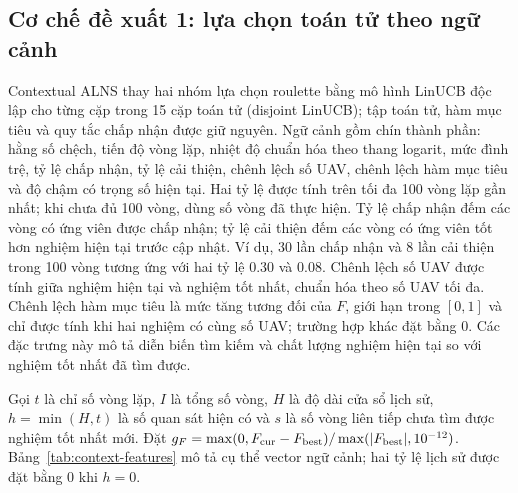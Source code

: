 \documentclass[11pt,a4paper]{article}
\begin{document}
\subsection{Cơ chế đề xuất 1: lựa chọn toán tử theo ngữ cảnh}
Contextual ALNS thay hai nhóm lựa chọn roulette bằng mô hình LinUCB độc lập cho từng cặp trong 15 cặp toán tử (disjoint LinUCB); tập toán tử, hàm mục tiêu và quy tắc chấp nhận được giữ nguyên. Ngữ cảnh gồm chín thành phần: hằng số chệch, tiến độ vòng lặp, nhiệt độ chuẩn hóa theo thang logarit, mức đình trệ, tỷ lệ chấp nhận, tỷ lệ cải thiện, chênh lệch số UAV, chênh lệch hàm mục tiêu và độ chậm có trọng số hiện tại. Hai tỷ lệ được tính trên tối đa 100 vòng lặp gần nhất; khi chưa đủ 100 vòng, dùng số vòng đã thực hiện. Tỷ lệ chấp nhận đếm các vòng có ứng viên được chấp nhận; tỷ lệ cải thiện đếm các vòng có ứng viên tốt hơn nghiệm hiện tại trước cập nhật. Ví dụ, 30 lần chấp nhận và 8 lần cải thiện trong 100 vòng tương ứng với hai tỷ lệ 0.30 và 0.08. Chênh lệch số UAV được tính giữa nghiệm hiện tại và nghiệm tốt nhất, chuẩn hóa theo số UAV tối đa. Chênh lệch hàm mục tiêu là mức tăng tương đối của $F$, giới hạn trong $[0,1]$ và chỉ được tính khi hai nghiệm có cùng số UAV; trường hợp khác đặt bằng 0. Các đặc trưng này mô tả diễn biến tìm kiếm và chất lượng nghiệm hiện tại so với nghiệm tốt nhất đã tìm được.

Gọi $t$ là chỉ số vòng lặp, $I$ là tổng số vòng, $H$ là độ dài cửa sổ lịch sử, $h=\min(H,t)$ là số quan sát hiện có và $s$ là số vòng liên tiếp chưa tìm được nghiệm tốt nhất mới. Đặt $g_F=\max(0,F_{\rm cur}-F_{\rm best})/\max(|F_{\rm best}|,10^{-12})$. Bảng~\ref{tab:context-features} mô tả cụ thể vector ngữ cảnh; hai tỷ lệ lịch sử được đặt bằng 0 khi $h=0$.
\end{document}
